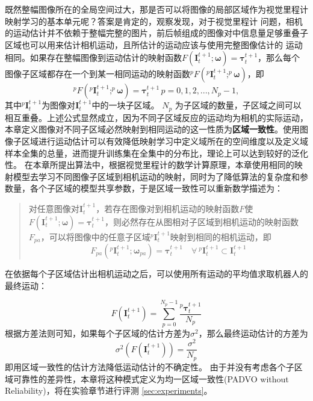 既然整幅图像所在的全局空间过大，那是否可以将图像的局部区域作为视觉里程计映射学习的基本单元呢？答案是肯定的，观察发现，对于视觉里程计
问题，相机的运动估计并不依赖于整幅完整的图片，前后帧组成的图像对中信息量足够重叠子区域也可以用来估计相机运动，且所估计的运动应该与使用完整图像估计的
运动相同。如果存在整幅图像到运动估计的映射函数$F(\mathbf{I}_t^{t+1};\mathbf{\omega}) = \mathbf{\tau}_t^{t+1}$，那么每个图像子区域都存在一个到某一相同运动的映射函数$^pF(^p\mathbf{I}_t^{t+1};^p\mathbf{\omega})$，即
\begin{equation}
  ^pF(^p\mathbf{I}_t^{t+1};^p\mathbf{\omega}) = \mathbf{\tau}_t^{t+1} \, p=0,1,2,...,N_p-1,
  \label{eq:patch_mapping}
\end{equation}
其中$^p\mathbf{I}_t^{t+1}$为图像对${\mathbf{I}}_t^{t+1}$中的一块子区域。
$N_p$ 为子区域的数量，子区域之间可以相互重叠。上述公式显然成立，因为不同子区域反应的运动均为相机的实际运动，本章定义图像对不同子区域必然映射到相同运动的这一性质为\textbf{区域一致性}。使用图像子区域进行运动估计可以有效降低映射学习中定义域所在的空间维度以及定义域样本全集的总量，进而提升训练集在全集中的分布比，理论上可以达到较好的泛化性。
在本章所提出算法中，根据视觉里程计的数学计算原理，本章使用相同的映射模型去学习不同图像子区域到相机运动的映射，同时为了降低算法的复杂度和参数量，各个子区域的模型共享参数，于是区域一致性可以重新数学描述为：
\begin{quote}
  对任意图像对$\mathbf{I}_t^{t+1}$，若存在图像对到相机运动的映射函数$F$使$F(\mathbf{I}_t^{t+1};\mathbf{\omega})=\mathbf{\tau}_t^{t+1}$，则必然存在从图相对子区域到相机运动的映射函数$F_{pa}$，可以将图像中的任意子区域$^p\mathbf{I}_t^{t+1}$映射到相同的相机运动，即
\begin{equation}
  F_{pa}(^p\mathbf{I}_t^{t+1};\mathbf{\omega}_{pa}) = \mathbf{\tau}_t^{t+1} \quad \forall\  ^p\mathbf{I}_t^{t+1} \subset \mathbf{I}_t^{t+1} 
  \label{eq:patch_mapping_2}
\end{equation}
\end{quote}

在依据每个子区域估计出相机运动之后，可以使用所有运动的平均值求取机器人的最终运动：

\begin{equation}
    F(\mathbf{I}_t^{t+1}) = \sum_{p=0}^{N_p-1}\frac{^p\mathbf{\tau}_t^{t+1}}{N_p}
\end{equation}
根据方差法则可知，如果每个子区域的估计方差为$\sigma^2$，那么最终运动估计的方差为
\begin{equation}
    \sigma^2 \left(F(\mathbf{I}_t^{t+1})\right) = \frac{\sigma^2}{N_p}
    \label{eq:pad_var_1}
\end{equation}
即用区域一致性的估计方法降低运动估计的不确定性。
由于并没有考虑各个子区域可靠性的差异性，本章将这种模式定义为均一区域一致性(PADVO without Reliability)，将在实验章节进行评测 \ref{sec:experiments}。

